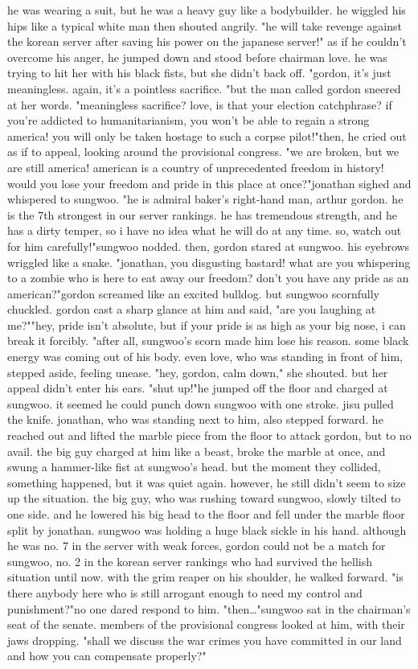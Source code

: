 he was wearing a suit, but he was a heavy guy like a bodybuilder.
 he wiggled his hips like a typical white man then shouted angrily.
"he will take revenge against the korean server after saving his power on the japanese server!"
as if he couldn't overcome his anger, he jumped down and stood before chairman love.
 he was trying to hit her with his black fists, but she didn't back off.
"gordon, it's just meaningless.
 again, it's a pointless sacrifice.
"but the man called gordon sneered at her words.
 "meaningless sacrifice? love, is that your election catchphrase? if you're addicted to humanitarianism, you won't be able to regain a strong america! you will only be taken hostage to such a corpse pilot!"then, he cried out as if to appeal, looking around the provisional congress.
"we are broken, but we are still america! american is a country of unprecedented freedom in history! would you lose your freedom and pride in this place at once?"jonathan sighed and whispered to sungwoo.
"he is admiral baker's right-hand man, arthur gordon.
 he is the 7th strongest in our server rankings.
 he has tremendous strength, and he has a dirty temper, so i have no idea what he will do at any time.
 so, watch out for him carefully!"sungwoo nodded.
 then, gordon stared at sungwoo.
 his eyebrows wriggled like a snake.
"jonathan, you disgusting bastard! what are you whispering to a zombie who is here to eat away our freedom? don't you have any pride as an american?"gordon screamed like an excited bulldog.
 but sungwoo scornfully chuckled.
gordon cast a sharp glance at him and said, "are you laughing at me?""hey, pride isn't absolute, but if your pride is as high as your big nose, i can break it forcibly.
"after all, sungwoo's scorn made him lose his reason.
 some black energy was coming out of his body.
 even love, who was standing in front of him, stepped aside, feeling unease.
 "hey, gordon, calm down," she shouted.
 but her appeal didn't enter his ears.
"shut up!"he jumped off the floor and charged at sungwoo.
 it seemed he could punch down sungwoo with one stroke.
jisu pulled the knife.
 jonathan, who was standing next to him, also stepped forward.
 he reached out and lifted the marble piece from the floor to attack gordon, but to no avail.
 the big guy charged at him like a beast, broke the marble at once, and swung a hammer-like fist at sungwoo's head.
but the moment they collided, something happened, but it was quiet again.
however, he still didn't seem to size up the situation.
the big guy, who was rushing toward sungwoo, slowly tilted to one side.
 and he lowered his big head to the floor and fell under the marble floor split by jonathan.
sungwoo was holding a huge black sickle in his hand.
 although he was no.
 7 in the server with weak forces, gordon could not be a match for sungwoo, no.
 2 in the korean server rankings who had survived the hellish situation until now.
with the grim reaper on his shoulder, he walked forward.
"is there anybody here who is still arrogant enough to need my control and punishment?"no one dared respond to him.
"then…"sungwoo sat in the chairman's seat of the senate.
 members of the provisional congress looked at him, with their jaws dropping.
"shall we discuss the war crimes you have committed in our land and how you can compensate properly?"

